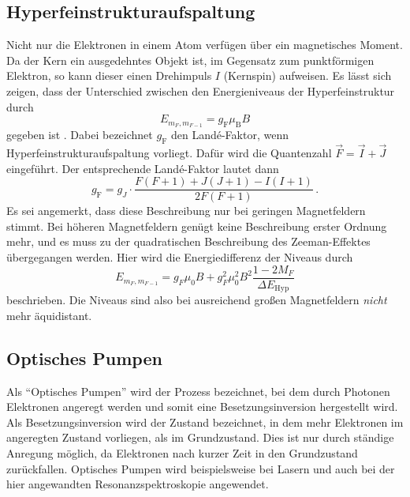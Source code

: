 \subsection{Hyperfeinstrukturaufspaltung}

Nicht nur die Elektronen in einem Atom verfügen über ein magnetisches Moment.
Da der Kern ein ausgedehntes Objekt ist, im Gegensatz zum punktförmigen Elektron, so kann dieser einen Drehimpuls $I$ (Kernspin) aufweisen.
Es lässt sich zeigen, dass der Unterschied zwischen den Energieniveaus der Hyperfeinstruktur durch
\begin{equation} \label{eq:landefaktor}
    E_{m_F,m_{F-1}} = g_\text{F} \mu_\text{B} B
\end{equation}
gegeben ist \cite{demtroeder3}.
Dabei bezeichnet $g_\text{F}$ den Landé-Faktor, wenn Hyperfeinstrukturaufspaltung vorliegt.
Dafür wird die Quantenzahl $\vec{F} = \vec{I} + \vec{J}$ eingeführt.
Der entsprechende Landé-Faktor \cite{optical_pumping} lautet dann
\begin{equation} \label{eq:g_F}
    g_\text{F} = g_J \cdot \frac{F(F+1)+J(J+1)-I(I+1)}{2F(F+1)} \, .
\end{equation}
Es sei angemerkt, dass diese Beschreibung nur bei geringen Magnetfeldern stimmt.
Bei höheren Magnetfeldern genügt keine Beschreibung erster Ordnung mehr, und es muss zu der quadratischen Beschreibung des Zeeman-Effektes übergegangen werden.
Hier wird die Energiedifferenz der Niveaus durch
\begin{equation*}
    E_{m_F,m_{F-1}} = g_F \mu_0 B+g_F^2 \mu_0^2 B^2 \frac{1-2 M_F}{\Delta E_{\mathrm{Hyp}}}
\end{equation*}
beschrieben. Die Niveaus sind also bei ausreichend großen Magnetfeldern \textit{nicht} mehr äquidistant.

\subsection{Optisches Pumpen}

Als \enquote{Optisches Pumpen} wird der Prozess bezeichnet, bei dem durch Photonen Elektronen angeregt werden und somit
eine Besetzungsinversion hergestellt wird.
Als Besetzungsinversion wird der Zustand bezeichnet, in dem mehr Elektronen im angeregten Zustand vorliegen, als im Grundzustand.
Dies ist nur durch ständige Anregung möglich, da Elektronen nach kurzer Zeit in den Grundzustand zurückfallen.
Optisches Pumpen  wird beispielsweise bei Lasern und auch bei der hier angewandten Resonanzspektroskopie angewendet.

